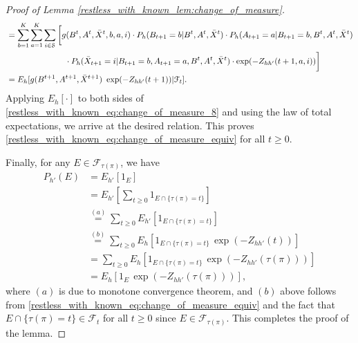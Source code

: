 \begin{proof}[Proof of Lemma \ref{restless_with_known_lem:change_of_measure}]
\begin{align}
&=\sum\limits_{b=1}^{K}\sum\limits_{a=1}^{K}\sum\limits_{i\in\mathcal{S}} \bigg[g(B^t,A^t,\bar{X}^t, b, a, i)\cdot P_h(B_{t+1}=b|B^t,A^t,\bar{X}^t) \cdot P_h(A_{t+1}=a|B_{t+1}=b,B^t,A^t,\bar{X}^t)\nonumber\\
&\hspace{2.5cm}\cdot P_h(\bar{X}_{t+1}=i|B_{t+1}=b,A_{t+1}=a,B^t,A^t,\bar{X}^t)\cdot \exp(-Z_{hh'}(t+1,a,i))\bigg]\\
&=E_h[g(B^{t+1},A^{t+1},\bar{X}^{t+1})~\exp(-Z_{hh'}(t+1))|\mathcal{F}_t].\label{restless_with_known_eq:change_of_measure_8}
 \end{align}\endgroup
 Applying $E_h[\cdot]$ to both sides of \eqref{restless_with_known_eq:change_of_measure_8} and using the law of total expectations, we arrive at the desired relation. This proves \eqref{restless_with_known_eq:change_of_measure_equiv} for all $t\geq 0$.
 
 Finally, for any $E\in\mathcal{F}_{\tau(\pi)}$, we have
 \begingroup \allowdisplaybreaks\begin{align}
 	P_{h'}(E)&=E_{h'}[1_{E}]\nonumber\\
 	&=E_{h'}\left[\sum\limits_{t\geq 0} 1_{E\cap \{\tau(\pi)= t\}}\right]\nonumber\\
 	&\stackrel{(a)}{=}\sum\limits_{t\geq 0}E_{h'}\left[1_{E\cap \{\tau(\pi)= t\}}\right]\nonumber\\
 	&\stackrel{(b)}{=}\sum\limits_{t\geq 0}E_h\left[1_{E\cap \{\tau(\pi)= t\}}\,\exp(-Z_{hh'}(t))\right]\nonumber\\
 	&=\sum\limits_{t\geq 0}E_h\left[1_{E\cap \{\tau(\pi)= t\}}\,\exp(-Z_{hh'}(\tau(\pi)))\right]\nonumber\\
 	&=E_h\left[1_{E}\,\exp(-Z_{hh'}(\tau(\pi)))\right],\label{restless_with_known_eq:change_of_measure_9}
 \end{align}\endgroup
 where $(a)$ is due to monotone convergence theorem, and $(b)$ above follows from \eqref{restless_with_known_eq:change_of_measure_equiv} and the fact that $E\cap \{\tau(\pi)=t\}\in\mathcal{F}_t$ for all $t\geq 0$ since $E\in\mathcal{F}_{\tau(\pi)}$. This completes the proof of the lemma.
\end{proof}

